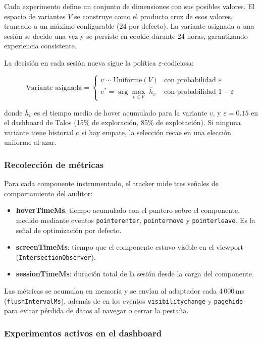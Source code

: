 \documentclass[11pt]{article}
\begin{document}
Cada experimento define un conjunto de dimensiones con sus posibles valores. El espacio de variantes \( V \) se construye como el producto cruz de esos valores, truncado a un máximo configurable (24 por defecto). La variante asignada a una sesión se decide una vez y se persiste en cookie durante 24 horas, garantizando experiencia consistente.

La decisión en cada sesión nueva sigue la política \(\varepsilon\)-codiciosa:

\[
\text{Variante asignada} = \begin{cases}
v \sim \text{Uniforme}(V) & \text{con probabilidad } \varepsilon \\[4pt]
v^* = \displaystyle\arg\max_{v \in V}\; \overline{h}_v & \text{con probabilidad } 1 - \varepsilon
\end{cases}
\]

donde \( \overline{h}_v \) es el tiempo medio de hover acumulado para la variante \( v \), y \( \varepsilon = 0.15 \) en el dashboard de Talos (15\% de exploración, 85\% de explotación). Si ninguna variante tiene historial o si hay empate, la selección recae en una elección uniforme al azar.

\subsubsection*{Recolección de métricas}

Para cada componente instrumentado, el tracker mide tres señales de comportamiento del auditor:

\begin{itemize}
    \item \textbf{hoverTimeMs}: tiempo acumulado con el puntero sobre el componente, medido mediante eventos \texttt{pointerenter}, \texttt{pointermove} y \texttt{pointerleave}. Es la señal de optimización por defecto.
    \item \textbf{screenTimeMs}: tiempo que el componente estuvo visible en el viewport (\texttt{IntersectionObserver}).
    \item \textbf{sessionTimeMs}: duración total de la sesión desde la carga del componente.
\end{itemize}

Las métricas se acumulan en memoria y se envían al adaptador cada 4\,000\,ms (\texttt{flushIntervalMs}), además de en los eventos \texttt{visibilitychange} y \texttt{pagehide} para evitar pérdida de datos al navegar o cerrar la pestaña.

\subsubsection*{Experimentos activos en el dashboard}
\end{document}
